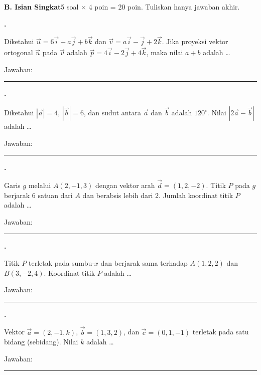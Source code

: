 \documentclass[a4paper,11pt]{article}
\newcounter{no}
\newcommand{\bagian}[2]{\par\Needspace{6\baselineskip}\vspace{1.0em}\noindent
  \begin{tcolorbox}[colback=navy,colframe=navy,coltext=white,boxrule=0pt,arc=2pt,left=6pt,right=6pt,top=3pt,bottom=3pt]
  \textbf{#1}\hfill{\small #2}\end{tcolorbox}\setcounter{no}{0}\par\vspace{-0.3em}}
\newcommand{\soal}[2]{\par\vspace{0.75em}\stepcounter{no}\noindent
  \begin{minipage}[t]{1.8em}\textbf{\theno.}\end{minipage}%
  \begin{minipage}[t]{\dimexpr\linewidth-1.8em\relax}#1\par\vspace{0.35em}#2\end{minipage}\par}
\begin{document}
\bagian{B. Isian Singkat}{5 soal $\times$ 4 poin = 20 poin. Tuliskan hanya jawaban akhir.}
\soal{Diketahui $\vec u=6\vec i+a\vec j+b\vec k$ dan $\vec v=a\vec i-\vec j+2\vec k$. Jika proyeksi vektor ortogonal $\vec u$ pada $\vec v$ adalah $\vec p=4\vec i-2\vec j+4\vec k$, maka nilai $a+b$ adalah \dots}{\hfill Jawaban: \rule{4.5cm}{0.4pt}}
\soal{Diketahui $|\vec a|=4$, $|\vec b|=6$, dan sudut antara $\vec a$ dan $\vec b$ adalah $120^\circ$. Nilai $|2\vec a-\vec b|$ adalah \dots}{\hfill Jawaban: \rule{4.5cm}{0.4pt}}
\soal{Garis $g$ melalui $A(2,-1,3)$ dengan vektor arah $\vec d=(1,2,-2)$. Titik $P$ pada $g$ berjarak $6$ satuan dari $A$ dan berabsis lebih dari $2$. Jumlah koordinat titik $P$ adalah \dots}{\hfill Jawaban: \rule{4.5cm}{0.4pt}}
\soal{Titik $P$ terletak pada sumbu-$x$ dan berjarak sama terhadap $A(1,2,2)$ dan $B(3,-2,4)$. Koordinat titik $P$ adalah \dots}{\hfill Jawaban: \rule{4.5cm}{0.4pt}}
\soal{Vektor $\vec a=(2,-1,k)$, $\vec b=(1,3,2)$, dan $\vec c=(0,1,-1)$ terletak pada satu bidang (sebidang). Nilai $k$ adalah \dots}{\hfill Jawaban: \rule{4.5cm}{0.4pt}}
\end{document}
